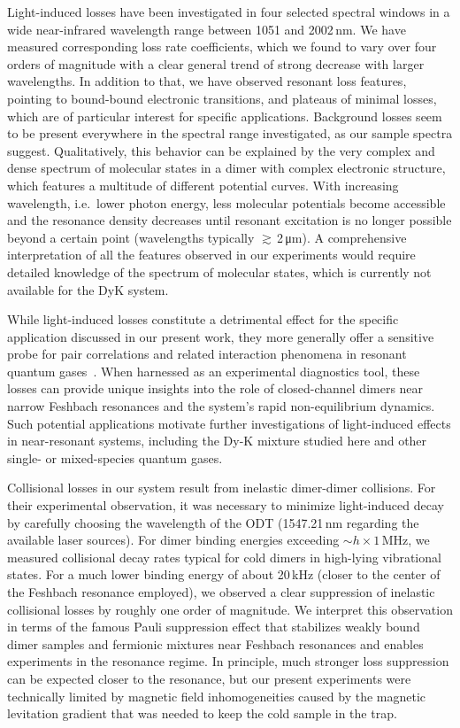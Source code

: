 Light-induced losses have been investigated in four selected spectral windows in a wide near-infrared wavelength range between 1051 and 2002\,nm. We have measured corresponding loss rate coefficients, which we found to vary over four orders of magnitude with a clear general trend of strong decrease with larger wavelengths. In addition to that, we have observed resonant loss features, pointing to bound-bound electronic transitions, and plateaus of minimal losses, which are of particular interest for specific applications. Background losses seem to be present everywhere in the spectral range investigated, as our sample spectra suggest. 
Qualitatively, this behavior can be explained by the very complex and dense spectrum of molecular states in a dimer with complex electronic structure, which features a multitude of different potential curves. With increasing wavelength, i.e.\ lower photon energy, less molecular potentials become accessible and the resonance density decreases until resonant excitation is no longer possible beyond a certain point (wavelengths typically $\gtrsim$\,2\,\unit{\micro m}). A comprehensive interpretation of all the features observed in our experiments would require detailed knowledge of the spectrum of molecular states, which is currently not available for the DyK system.

While light-induced losses constitute a detrimental effect for the specific application discussed in our present work, they more generally offer a sensitive probe for pair correlations and related interaction phenomena in resonant quantum gases~\cite{Partridge2005mpo, Liu2021oot, Jaeger2024ppm, Journeaux2026tbc}. When harnessed as an experimental diagnostics tool, these losses can provide unique insights into the role of closed-channel dimers near narrow Feshbach resonances and the system's rapid non-equilibrium dynamics. Such potential applications motivate further investigations of light-induced effects in near-resonant systems, including the Dy-K mixture studied here and other single- or mixed-species quantum gases.

Collisional losses {in our system} result from inelastic dimer-dimer collisions. {For their experimental observation}, it was necessary to minimize light-induced decay by carefully choosing the wavelength of the ODT (1547.21\,nm regarding the available laser sources). For dimer binding energies exceeding $\sim h \times 1\,$MHz, we measured collisional decay rates typical for cold dimers in high-lying vibrational states. For a much lower binding energy of about 20\,kHz (closer to the center of the Feshbach resonance employed), we observed a clear suppression of inelastic collisional losses by roughly one order of magnitude. We interpret this observation in terms of the famous Pauli suppression effect that stabilizes weakly bound dimer samples and fermionic mixtures near Feshbach resonances and enables experiments in the resonance regime. 
In principle, much stronger loss suppression can be expected closer to the resonance, but  our  present experiments were technically limited by magnetic field inhomogeneities caused by the magnetic levitation gradient that was needed to keep the cold sample in the trap.


